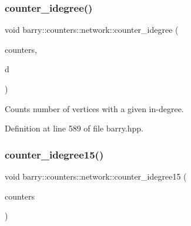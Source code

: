 \mbox{\label{namespacebarry_1_1counters_1_1network_ab87617883960a1fc818048036fb13b83}} 
\subsubsection{\texorpdfstring{counter\+\_\+idegree()}{counter\_idegree()}}
{\footnotesize\ttfamily void barry\+::counters\+::network\+::counter\+\_\+idegree (\begin{DoxyParamCaption}\item[{\hyperlink{namespacebarry_1_1counters_1_1network_a3b3c590303d47840d1967372ae495d95}{Net\+Counter\+Vector} $\ast$}]{counters,  }\item[{std\+::vector$<$ \hyperlink{namespacebarry_a11dfc53ddb4672278319aa04f1e09a6c}{uint} $>$}]{d }\end{DoxyParamCaption})\hspace{0.3cm}{\ttfamily [inline]}}



Counts number of vertices with a given in-\/degree. 



Definition at line 589 of file barry.\+hpp.

\mbox{\label{namespacebarry_1_1counters_1_1network_a148e6fbb549eea53ff6d744b0f683ed6}} 
\subsubsection{\texorpdfstring{counter\+\_\+idegree15()}{counter\_idegree15()}}
{\footnotesize\ttfamily void barry\+::counters\+::network\+::counter\+\_\+idegree15 (\begin{DoxyParamCaption}\item[{\hyperlink{namespacebarry_1_1counters_1_1network_a3b3c590303d47840d1967372ae495d95}{Net\+Counter\+Vector} $\ast$}]{counters }\end{DoxyParamCaption})\hspace{0.3cm}{\ttfamily [inline]}}



